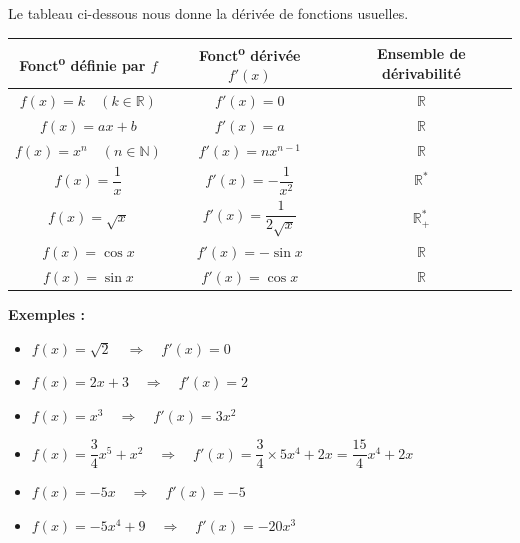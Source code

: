 \documentclass[12pt,a4paper]{article}
\begin{document}
\begin{tcolorbox}[
    colback=green!5,
    colframe=green!60!black,
    colbacktitle=green!60!black,
    title=\textbf{2. Dérivée des fonctions usuelles},
    fonttitle=\bfseries,
    boxrule=0.8pt
]

Le tableau ci-dessous nous donne la dérivée de fonctions usuelles.

\begin{center}
\renewcommand{\arraystretch}{1.2}

\begin{tabular}{|c|c|c|}
\hline
\textbf{Fonct\textsuperscript{o} définie par $f$}
&
\textbf{Fonct\textsuperscript{o} dérivée $f'(x)$}
&
\textbf{Ensemble de dérivabilité}
\\[1.2mm]
\hline

$f(x)=k\quad (k\in\mathbb{R})$
&
$f'(x)=0$
&
$\mathbb{R}$
\\[1.2mm]
\hline

$f(x)=ax+b$
&
$f'(x)=a$
&
$\mathbb{R}$
\\[1.2mm]
\hline

$f(x)=x^n\quad (n\in\mathbb{N})$
&
$f'(x)=nx^{n-1}$
&
$\mathbb{R}$
\\[1.2mm]
\hline

$f(x)=\dfrac{1}{x}$
&
$f'(x)=-\dfrac{1}{x^2}$
&
$\mathbb{R}^*$
\\[1.2mm]
\hline

$f(x)=\sqrt{x}$
&
$f'(x)=\dfrac{1}{2\sqrt{x}}$
&
$\mathbb{R}_+^*$
\\[1.2mm]
\hline

$f(x)=\cos x$
&
$f'(x)=-\sin x$
&
$\mathbb{R}$
\\[1.2mm]
\hline

$f(x)=\sin x$
&
$f'(x)=\cos x$
&
$\mathbb{R}$
\\[1.2mm]
\hline

\end{tabular}

\end{center}

\end{tcolorbox}

\textbf{Exemples :}

\begin{itemize}

    \item $f(x)=\sqrt{2}
    \quad\Longrightarrow\quad
    f'(x)=0$

    \item $f(x)=2x+3
    \quad\Longrightarrow\quad
    f'(x)=2$

    \item $f(x)=x^3
    \quad\Longrightarrow\quad
    f'(x)=3x^2$

    \item $f(x)=\dfrac{3}{4}x^5+x^2
    \quad\Longrightarrow\quad
    f'(x)=\dfrac{3}{4}\times5x^4+2x
    =\dfrac{15}{4}x^4+2x$

    \item $f(x)=-5x
    \quad\Longrightarrow\quad
    f'(x)=-5$

    \item $f(x)=-5x^4+9
    \quad\Longrightarrow\quad
    f'(x)=-20x^3$

\end{itemize}
\end{document}
